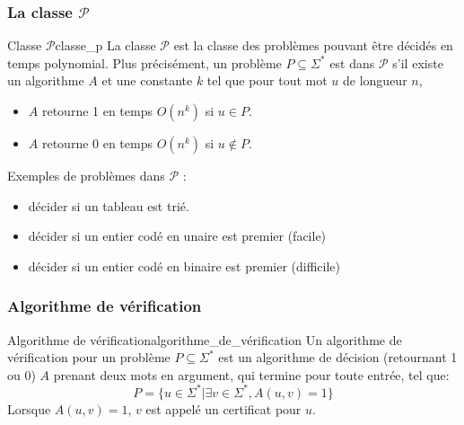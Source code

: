 \subsubsection{La classe $\mathcal{P}$}
\label{sub:la_classe_p}
\begin{definition}{Classe $\mathcal{P}$}{classe_p}
    La classe $\mathcal{P}$ est la classe des problèmes pouvant être décidés en temps polynomial. Plus précisément,
    un problème $P\subseteq\Sigma^*$ est dans $\mathcal{P}$ s'il existe un algorithme $A$ et une constante $k$ tel que
    pour tout mot $u$ de longueur $n$,
    \begin{itemize}[label=\textbullet]
        \item $A$ retourne 1 en temps $O(n^k)$ si $u\in P$.
        \item $A$ retourne 0 en temps $O(n^k)$ si $u\notin P$.
    \end{itemize}
\end{definition}
\begin{example}
    Exemples de problèmes dans $\mathcal{P}$ :
    \begin{itemize}[label=\textbullet]
        \item décider si un tableau est trié.
        \item décider si un entier codé en unaire est premier (facile)
        \item décider si un entier codé en binaire est premier (difficile)
    \end{itemize}
\end{example}


\subsubsection{Algorithme de vérification}
\label{sub:algorithme_de_verification}
\begin{definition}{Algorithme de vérification}{algorithme_de_vérification}
    Un algorithme de vérification pour un problème $P\subseteq\Sigma^*$ est un algorithme de décision (retournant 1 ou 0)
    $A$ prenant deux mots en argument, qui termine pour toute entrée, tel que:
    \begin{equation*}
        P = \{u\in\Sigma^* | \exists v \in \Sigma^*, A(u,v)=1\}
    \end{equation*}
    Lorsque $A(u,v)=1$, $v$ est appelé un certificat pour $u$.
\end{definition}

